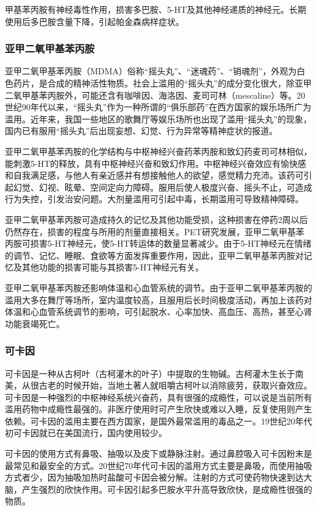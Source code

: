 甲基苯丙胺有神经毒性作用，损害多巴胺、5-HT及其他神经递质的神经元。长期使用后多巴胺含量下降，引起帕金森病样症状。

\subsubsection{亚甲二氧甲基苯丙胺}

亚甲二氧甲基苯丙胺（MDMA）俗称``摇头丸''、``迷魂药''、``销魂剂''，外观为白色药片，是合成的精神活性物质。社会上滥用的``摇头丸''的成分变化很大，除亚甲二氧甲基苯丙胺外，可能还含有咖啡因、海洛因、麦司可林（mescaline）等。20世纪90年代以来，``摇头丸''作为一种所谓的``俱乐部药''在西方国家的娱乐场所广为滥用。近年来，我国一些地区的歌舞厅等娱乐场所也出现了滥用``摇头丸''的现象，国内已有服用``摇头丸''后出现妄想、幻觉、行为异常等精神症状的报道。

亚甲二氧甲基苯丙胺的化学结构与中枢神经兴奋药苯丙胺和致幻药麦司可林相似，能刺激5-HT的释放，具有中枢神经兴奋和致幻作用。中枢神经兴奋效应有愉快感和自我满足感，与他人有亲近感并有想接触他人的欲望，感觉精力充沛。该药可引起幻觉、幻视、眩晕、空间定向力障碍。服用后使人极度兴奋、摇头不止，可造成行为失控，引发治安问题。大剂量滥用可引起中毒，长期滥用可导致精神障碍。

亚甲二氧甲基苯丙胺可造成持久的记忆及其他功能受损，这种损害在停药2周以后仍然存在，损害的程度与所用的剂量直接相关。PET研究发展，亚甲二氧甲基苯丙胺可损害5-HT神经元，使5-HT转运体的数量显著减少。由于5-HT神经元在情绪的调节、记忆、睡眠、食欲等方面发挥重要作用，因此，亚甲二氧甲基苯丙胺对记忆及其他功能的损害可能与其损害5-HT神经元有关。

亚甲二氧甲基苯丙胺还影响体温和心血管系统的调节。由于亚甲二氧甲基苯丙胺的滥用大多在舞厅等场所，室内温度较高，且服用后长时间极度活动，再加上该药对体温和心血管系统调节的影响，可引起脱水、心率加快、高血压、高热，甚至心肾功能衰竭死亡。

\subsubsection{可卡因}

可卡因是一种从古柯叶（古柯灌木的叶子）中提取的生物碱。古柯灌木生长于南美，从很古老的时候开始，当地土著人就咀嚼古柯叶以消除疲劳，获取兴奋效应。可卡因是一种强烈的中枢神经系统兴奋药，具有很强的成瘾性，可以说是当前所有滥用药物中成瘾性最强的。非医疗使用时可产生欣快或难以入睡，反复使用则产生依赖。可卡因的滥用主要在西方国家，是国外最常滥用的毒品之一。19世纪20年代初可卡因就已在美国流行，国内使用较少。

可卡因的使用方式有鼻吸、抽吸以及皮下或静脉注射。通过鼻腔吸入可卡因粉末是最常见和最安全的方式。20世纪70年代可卡因的滥用方式主要是鼻吸，而使用抽吸方式者少，因为抽吸加热时盐酸可卡因会被分解。注射的方式可使药物快速到达大脑，产生强烈的欣快作用。可卡因引起多巴胺水平升高导致欣快，是成瘾性很强的物质。

